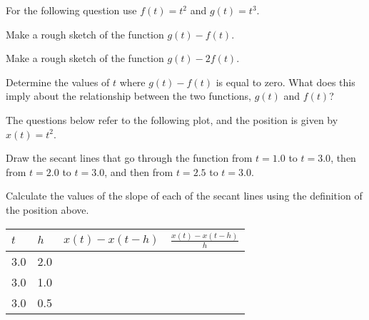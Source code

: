 \begin{problem}
\item For the following question use $f(t)=t^2$ and $g(t)=t^3$.
  \begin{subproblem}
  \item Make a rough sketch of the function $g(t)-f(t)$.  

    \vfill

  \item Make a rough sketch of the function $g(t)-2f(t)$.  

    \vfill

  \item Determine the values of $t$ where $g(t)-f(t)$ is equal to
    zero. What does this imply about the relationship between the two
    functions, $g(t)$ and $f(t)$?

    \vspace{3em}

  \end{subproblem}

  \clearpage

\item The questions below refer to the following plot, and the
  position is given by $x(t)=t^2$.

  \scalebox{0.7}{}

  \begin{subproblem}
    \item Draw the secant lines that go through the function from
      $t=1.0$ to $t=3.0$, then from $t=2.0$ to $t=3.0$, and then from
      $t=2.5$ to $t=3.0$.
    \item Calculate the values of the slope of each of the secant
      lines using the definition of the position above.

      \begin{tabular}{l|l|l|l}
        $t$ & $h$ & $x(t)-x(t-h)$ & $\frac{x(t)-x(t-h)}{h}$ \\ \hline
        3.0 & 2.0 & & \\ [15pt]
        3.0 & 1.0 & & \\ [15pt]
        3.0 & 0.5 & & \\ [15pt]
      \end{tabular}

  \end{subproblem}


\end{problem}
